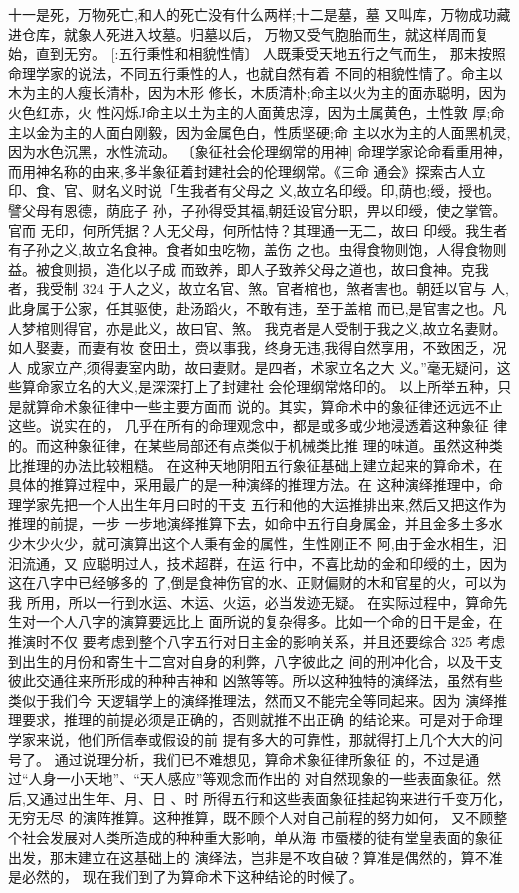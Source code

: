 十一是死，万物死亡,和人的死亡没有什么两样;十二是墓，墓
又叫库，万物成功藏进仓库，就象人死进入坟墓。归墓以后，
万物又受气胞胎而生，就这样周而复始，直到无穷。
[:五行秉性和相貌性情〕 人既秉受天地五行之气而生，
那末按照命理学家的说法，不同五行秉性的人，也就自然有着
不同的相貌性情了。命主以木为主的人瘦长清朴，因为木形
修长，木质清朴;命主以火为主的面赤聪明，因为火色红赤，火
性闪烁J命主以土为主的人面黄忠淳，因为土属黄色，土性敦
厚;命主以金为主的人面白刚毅，因为金属色白，性质坚硬;命
主以水为主的人面黑机灵,因为水色沉黑，水性流动。
〔象征社会伦理纲常的用神] 命理学家论命看重用神，
而用神名称的由来,多半象征着封建社会的伦理纲常。《三命
通会》探索古人立印、食、官、财名义时说「生我者有父母之
义,故立名印绶。印,荫也;绶，授也。譬父母有恩德，荫庇子
孙，子孙得受其福,朝廷设官分职，畀以印绶，使之掌管。官而
无印，何所凭据？人无父母，何所怙恃？其理通一无二，故曰
印绶。我生者有子孙之义,故立名食神。食者如虫吃物，盖伤
之也。虫得食物则饱，人得食物则益。被食则损，造化以子成
而致养，即人子致养父母之道也，故曰食神。克我者，我受制
 324 
于人之义，故立名官、煞。官者棺也，煞者害也。朝廷以官与
人,此身属于公家，任其驱使，赴汤蹈火，不敢有违，至于盖棺
而已,是官害之也。凡人梦棺则得官，亦是此义，故曰官、煞。
我克者是人受制于我之义,故立名妻财。如人娶妻，而妻有妆
奁田土，赍以事我，终身无违,我得自然享用，不致困乏，况人
成家立产,须得妻室内助，故曰妻财。是四者，术家立名之大
义。”毫无疑问，这些算命家立名的大义,是深深打上了封建社
会伦理纲常烙印的。
以上所举五种，只是就算命术象征律中一些主要方面而
说的。其实，算命术中的象征律还远远不止这些。说实在的，
几乎在所有的命理观念中，都是或多或少地浸透着这种象征
律的。而这种象征律，在某些局部还有点类似于机械类比推
理的味道。虽然这种类比推理的办法比较粗糙。
在这种天地阴阳五行象征基础上建立起来的算命术，在
具体的推算过程中，采用最广的是一种演绎的推理方法。在
这种演绎推理中，命理学家先把一个人出生年月曰时的干支
五行和他的大运推排出来,然后又把这作为推理的前提，一步
一步地演绎推算下去，如命中五行自身属金，并且金多土多水
少木少火少，就可演算出这个人秉有金的属性，生性刚正不
阿,由于金水相生，汩汩流通，又 应聪明过人，技术超群，在运
行中，不喜比劫的金和印绶的土，因为这在八字中已经够多的
了,倒是食神伤官的水、正财偏财的木和官星的火，可以为我
所用，所以一行到水运、木运、火运，必当发迹无疑。
在实际过程中，算命先生对一个人八字的演算要远比上
面所说的复杂得多。比如一个命的日干是金，在推演时不仅
要考虑到整个八字五行对日主金的影响关系，并且还要综合
 325 
考虑到出生的月份和寄生十二宫对自身的利弊，八字彼此之
间的刑冲化合，以及干支彼此交通往来所形成的种种吉神和
凶煞等等。所以这种独特的演绎法，虽然有些类似于我们今
天逻辑学上的演绎推理法，然而又不能完全等同起来。因为
演绎推理要求，推理的前提必须是正确的，否则就推不出正确
的结论来。可是对于命理学家来说，他们所信奉或假设的前
提有多大的可靠性，那就得打上几个大大的问号了。
通过说理分析，我们已不难想见，算命术象征律所象征
的，不过是通过“人身一小天地”、“天人感应”等观念而作出的
对自然现象的一些表面象征。然后,又通过出生年、月、日 、时
所得五行和这些表面象征挂起钩来进行千变万化，无穷无尽
的演阵推算。这种推算，既不顾个人对自己前程的努力如何，
又不顾整个社会发展对人类所造成的种种重大影响，单从海
市蜃楼的徒有堂皇表面的象征出发，那末建立在这基础上的
演绎法，岂非是不攻自破？算准是偶然的，算不准是必然的，
现在我们到了为算命术下这种结论的时候了。

